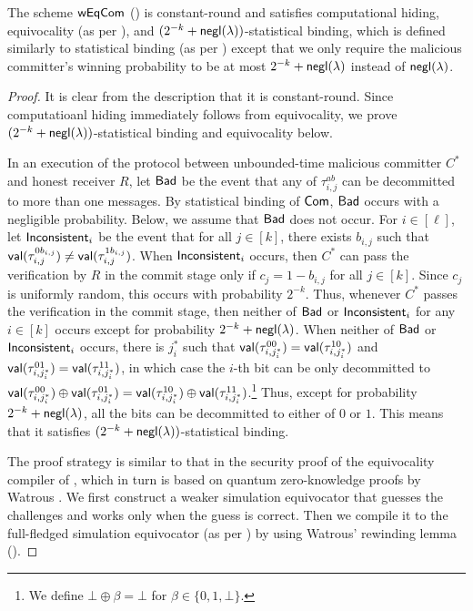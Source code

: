 \begin{theorem}
The scheme $\mathsf{wEqCom}$ () is constant-round and satisfies computational hiding, equivocality (as per ), and $(2^{-k}+\mathsf{negl}(\lambda))$-statistical binding, which is defined similarly to statistical binding (as per ) except that we only require the malicious committer's winning probability to be at most $2^{-k}+\mathsf{negl}(\lambda)$ instead of $\mathsf{negl}(\lambda)$. 
\end{theorem}
\begin{proof}
It is clear from the description that it is constant-round. 
Since computatioanl hiding immediately follows from equivocality, we prove $(2^{-k}+\mathsf{negl}(\lambda))$-statistical binding and equivocality below.

In an execution of the protocol between unbounded-time malicious committer $C^*$ and honest receiver $R$,  
let $\mathsf{Bad}$ be the event that any of $\tau_{i,j}^{ab}$ can be decommitted to more than one messages.  By statistical binding of $\mathsf{Com}$, $\mathsf{Bad}$ occurs with a negligible probability. Below, we assume that $\mathsf{Bad}$ does not occur. 
For $i\in [\ell]$, let $\mathsf{Inconsistent}_i$ be the event that for all $j\in [k]$, there exists $b_{i,j}$ such that $\mathsf{val}(\tau_{i,j}^{0b_{i,j}})\neq \mathsf{val}(\tau_{i,j}^{1b_{i,j}})$. 
When $\mathsf{Inconsistent}_i$ occurs, then $C^*$ can pass the verification by $R$ in the commit stage only if $c_j=1-b_{i,j}$ for all $j\in [k]$. Since $c_j$ is uniformly random, this occurs with probability $2^{-k}$. Thus, whenever $C^*$ passes the verification in the commit stage, then neither of $\mathsf{Bad}$ or $\mathsf{Inconsistent}_i$ for any $i\in [k]$ occurs except for probability $2^{-k}+\mathsf{negl}(\lambda)$. 
When neither of $\mathsf{Bad}$ or $\mathsf{Inconsistent}_i$ occurs, there is $j^*_i$ such that $\mathsf{val}(\tau_{i,j^*_i}^{00})= \mathsf{val}(\tau_{i,j^*_i}^{10})$ and $\mathsf{val}(\tau_{i,j^*_i}^{01})= \mathsf{val}(\tau_{i,j^*_i}^{11})$, in which case the $i$-th bit can be only decommitted to $\mathsf{val}(\tau_{i,j^*_i}^{00})\oplus \mathsf{val}(\tau_{i,j^*_i}^{01})=\mathsf{val}(\tau_{i,j^*_i}^{10})\oplus \mathsf{val}(\tau_{i,j^*_i}^{11})$.\footnote{We define $\bot\oplus \beta = \bot$ for $\beta\in\{0,1,\bot\}$.} 
Thus, except for probability $2^{-k}+\mathsf{negl}(\lambda)$, all the bits can be decommitted to either of $0$ or $1$.   
This means that it satisfies $(2^{-k}+\mathsf{negl}(\lambda))$-statistical binding. 

The proof strategy is similar to that in the security proof of the equivocality compiler of \cite{C:BCKM21b}, which in turn is based on quantum zero-knowledge proofs by Watrous \cite{SIAM:Watrous09}. 
We first construct a weaker simulation equivocator that guesses the challenges and works only when the guess is correct. 
Then we compile it to the full-fledged simulation equivocator (as per ) by using Watrous' rewinding lemma ().


\end{proof}
